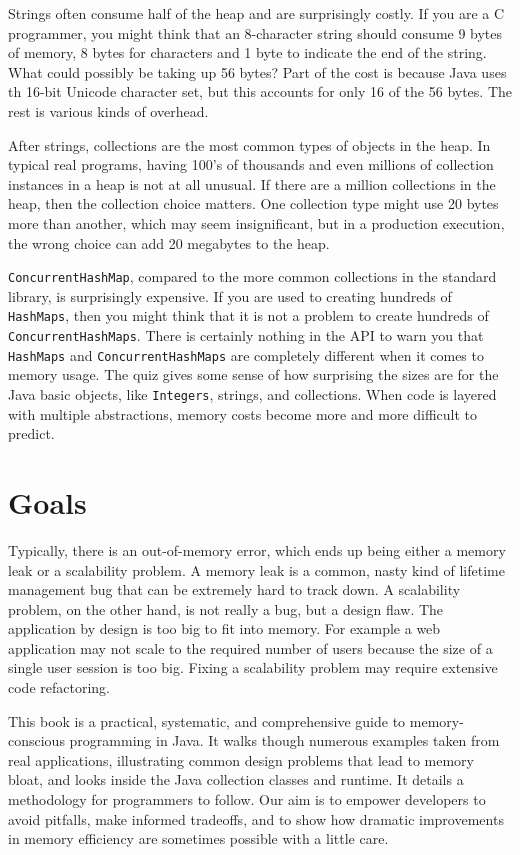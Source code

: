 Strings often consume half of the heap and are surprisingly costly. If you are a C programmer, you might think that an 8-character string should consume 9 bytes of memory, 8 bytes for characters and 1 byte to indicate the end of the string. What could possibly be taking up 56 bytes? Part of the cost is because Java uses th 16-bit Unicode character set, but this accounts for only 16 of the 56 bytes. The rest is various kinds of overhead.

After strings, collections are the most common types of objects in the heap. In typical real programs, having 100's of thousands and even millions of collection instances in a heap is not at all unusual. If there are a million collections in the heap, then the collection choice matters. One collection type might use 20 bytes more than another, which may seem insignificant, but in a production execution, the wrong choice can add 20 megabytes to the heap.

\texttt{ConcurrentHashMap}, compared to the more common collections in the standard library, is surprisingly expensive. If you are used to creating hundreds of \texttt{HashMaps}, then you might think that it is not a problem to create hundreds of \texttt{ConcurrentHashMaps}. There is certainly nothing in the API to warn you that \texttt{HashMaps} and \texttt{ConcurrentHashMaps} are completely different when it comes to memory usage. 
The quiz gives some sense of how surprising the sizes are for the Java basic objects, like \texttt{Integers}, strings, and collections. When code is layered with multiple abstractions, memory costs become more and more difficult to predict.

\section{Goals}

 Typically, there is an out-of-memory error, which ends up being either a memory leak or a scalability problem. A memory leak is a common, nasty kind of lifetime management bug that can be extremely hard to track down. A scalability problem, on the other hand, is not really a bug, but a design flaw. The application by design is too big to fit into memory. For example a web application may not scale to the required number of users because the size of a single user session is too big. Fixing a scalability problem may require extensive code refactoring.

This book is a practical, systematic, and comprehensive guide to memory-conscious programming in Java. It walks though numerous examples taken from real applications, illustrating common design problems that lead to memory bloat, and looks inside the Java collection classes and runtime. It details a methodology for programmers to follow. Our aim is to empower developers to avoid pitfalls, make informed tradeoffs, and to show how dramatic improvements in memory efficiency are sometimes possible with a little care.



